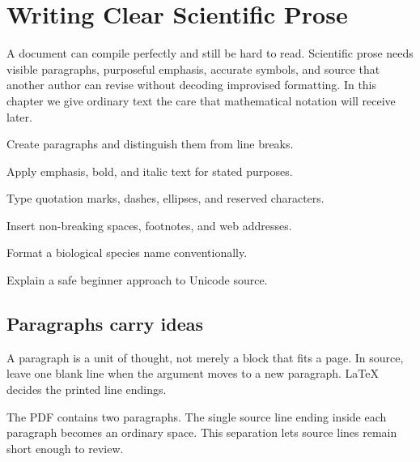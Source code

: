 \chapter{Writing Clear Scientific Prose}
\label{chap:text}

A document can compile perfectly and still be hard to read. Scientific prose
needs visible paragraphs, purposeful emphasis, accurate symbols, and source
that another author can revise without decoding improvised formatting. In this
chapter we give ordinary text the care that mathematical notation will receive
later.

\begin{learningoutcomes}
  \item Create paragraphs and distinguish them from line breaks.
  \item Apply emphasis, bold, and italic text for stated purposes.
  \item Type quotation marks, dashes, ellipses, and reserved characters.
  \item Insert non-breaking spaces, footnotes, and web addresses.
  \item Format a biological species name conventionally.
  \item Explain a safe beginner approach to Unicode source.
\end{learningoutcomes}

\section{Paragraphs carry ideas}

A paragraph is a unit of thought, not merely a block that fits a page. In
source, leave one blank line when the argument moves to a new paragraph.
\LaTeX{} decides the printed line endings.


The PDF contains two paragraphs. The single source line ending inside each
paragraph becomes an ordinary space. This separation lets source lines remain
short enough to review.

